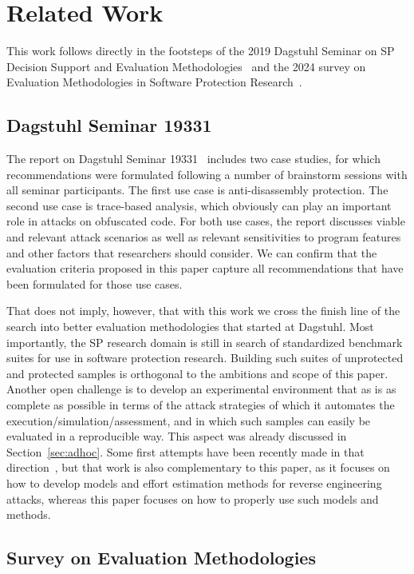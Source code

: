 \section{Related Work}
This work follows directly in the footsteps of the 2019 Dagstuhl Seminar on SP Decision Support and Evaluation Methodologies~\cite{Dagstuhl} and the 2024 survey on Evaluation Methodologies in Software Protection Research~\cite{desutter2024evaluation}.

\subsection{Dagstuhl Seminar 19331}
The report on Dagstuhl Seminar 19331~\cite{Dagstuhl} includes two case studies, for which recommendations were formulated following a number of brainstorm sessions with all seminar participants. The first use case is anti-disassembly protection. The second use case is trace-based analysis, which obviously can play an important role in attacks on obfuscated code. For both use cases, the report discusses viable and relevant attack scenarios as well as relevant sensitivities to program features and other factors that researchers should consider. We can confirm that the evaluation criteria proposed in this paper capture all recommendations that have been formulated for those use cases. 

That does not imply, however, that with this work we cross the finish line of the search into better evaluation methodologies that started at Dagstuhl. Most importantly, the SP research domain is still in search of standardized benchmark suites for use in software protection research. Building such suites of unprotected and protected samples is orthogonal to the ambitions and scope of this paper. Another open challenge is to develop an experimental environment that as is as complete as possible in terms of the attack strategies of which it automates the execution/simulation/assessment, and in which such samples can easily be evaluated in a reproducible way. This aspect was already discussed in Section~\ref{sec:adhoc}. Some first attempts have been recently made in that direction~\cite{checkmate24}, but that work is also complementary to this paper, as it focuses on how to develop models and effort estimation methods for reverse engineering attacks, whereas this paper focuses on how to properly use such models and methods.  

\subsection{Survey on Evaluation Methodologies}

